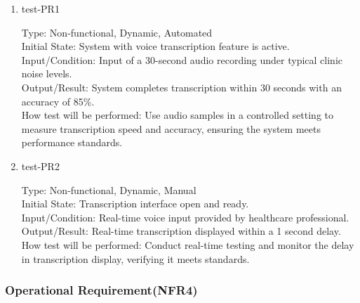 \documentclass[12pt, titlepage]{article}
\begin{document}
\begin{enumerate}
    \item{test-PR1\\} \label{test-PR1}
    
    Type: Non-functional, Dynamic, Automated\\
    
    Initial State: System with voice transcription feature is active.\\
    
    Input/Condition: Input of a 30-second audio recording under typical clinic noise levels.\\
    
    Output/Result: System completes transcription within 30 seconds with an accuracy of 85\%.\\
    
    How test will be performed: Use audio samples in a controlled setting to measure transcription speed and accuracy, ensuring the system meets performance standards.

    \item{test-PR2\\} \label{test-PR2}
    
    Type: Non-functional, Dynamic, Manual\\
    
    Initial State: Transcription interface open and ready.\\
    
    Input/Condition: Real-time voice input provided by healthcare professional.\\
    
    Output/Result: Real-time transcription displayed within a 1 second delay.\\
    
    How test will be performed: Conduct real-time testing and monitor the delay in transcription display, verifying it meets standards.
\end{enumerate}

\subsubsection{Operational Requirement(NFR4)} \label{section:4.2.4}
\end{document}
